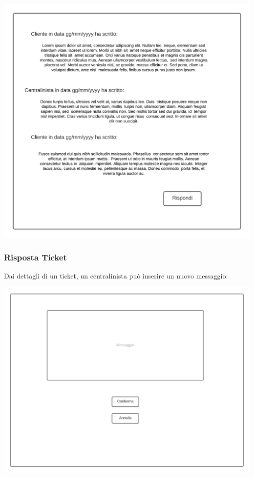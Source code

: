 \documentclass[12pt]{article}
\begin{document}
\begin{center}
\includegraphics[height=0.3\textheight]{Mockup/Centralinista/DettagliTicket}
\end{center}

\subsubsection{Risposta Ticket}
Dai dettagli di un ticket, un centralinista può inserire un nuovo messaggio:

\begin{center}
\includegraphics[height=0.3\textheight]{Mockup/Centralinista/RispostaTicket}
\end{center}
\end{document}
